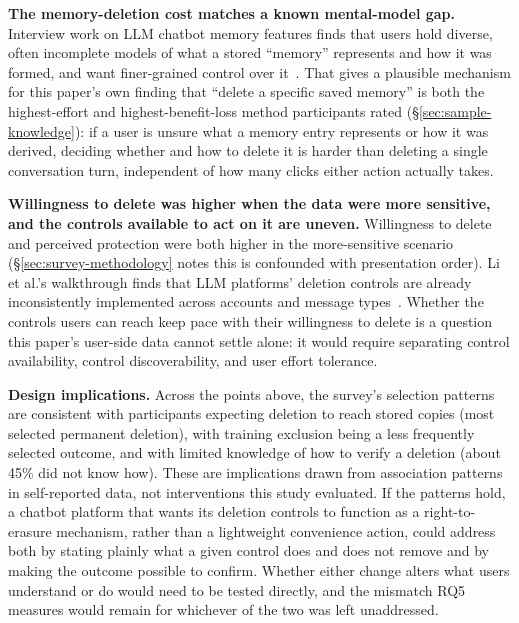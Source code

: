 \documentclass[conference,compsoc]{IEEEtran}
\begin{document}
\textbf{The memory-deletion cost matches a known mental-model gap.}
Interview work on LLM chatbot memory features finds that users hold
diverse, often incomplete models of what a stored ``memory'' represents
and how it was formed, and want finer-grained control over
it~\cite{zhang2025understanding}. That gives a plausible mechanism for
this paper's own finding that ``delete a specific saved memory'' is both
the highest-effort and highest-benefit-loss method participants
rated (\S\ref{sec:sample-knowledge}): if a user is unsure what a memory
entry represents or how it was derived, deciding whether and how to
delete it is harder than deleting a single conversation turn, independent
of how many clicks either action actually takes.

\textbf{Willingness to delete was higher when the data were more sensitive,
and the controls available to act on it are uneven.} Willingness to delete and
perceived protection were both higher in the more-sensitive scenario
(\S\ref{sec:survey-methodology} notes this is confounded with presentation
order). Li et al.'s
walkthrough finds that LLM platforms' deletion controls are already
inconsistently implemented across accounts and message types~\cite{li2026privacy}.
Whether the controls users can reach keep pace with their willingness to
delete is a question this paper's user-side data cannot settle alone: it would
require separating control availability, control discoverability, and user
effort tolerance.

\textbf{Design implications.} Across the points above, the survey's selection
patterns are consistent with participants expecting deletion to reach stored
copies (most selected permanent deletion), with training exclusion being a
less frequently selected outcome, and with limited knowledge of how to verify
a deletion (about 45\% did not know how). These are implications drawn from
association patterns in self-reported data, not interventions this study
evaluated. If the patterns hold, a chatbot platform that wants its deletion
controls to function as a right-to-erasure mechanism, rather than a
lightweight convenience action, could address both by stating plainly what a
given control does and does not remove and by making the outcome possible to
confirm. Whether either change alters what users understand or do would need
to be tested directly, and the mismatch RQ5 measures would remain for
whichever of the two was left unaddressed.
\end{document}
